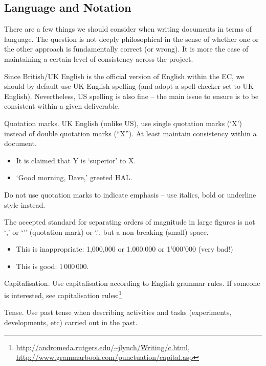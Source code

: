 \subsection{Language and Notation}
\label{sec:language-and_notation}

There are a few things we should consider when writing documents in terms of language. The question is not deeply philosophical in the sense of whether one or the other approach is fundamentally correct (or wrong). It is more the case of maintaining a certain level of consistency across the project.

Since British/UK English is the official version of English within the EC, we should by default use UK English spelling (and adopt a spell-checker set to UK English). Nevertheless, US spelling is also fine – the main issue to ensure is to be consistent within a given deliverable.

Quotation marks. UK English (unlike US), use single quotation marks (‘X’) instead of double quotation marks (``X''). At least maintain consistency within a document. 

\begin{itemize}
    \item It is claimed that Y is ‘superior’ to X. 
    \item ‘Good morning, Dave,’ greeted HAL.
\end{itemize}

Do not use quotation marks to indicate emphasis – use italics, bold or underline style instead.

The accepted standard for separating orders of magnitude in large figures is not ‘,’ or ‘’’ (quotation mark) or ‘.’, but a non-breaking (small) space. 

\begin{itemize}
    \item This is inappropriate: 1,000,000 or 1.000.000 or 1’000’000 (very bad!) 
    \item This is good: $1\,000\,000$. 
\end{itemize}

Capitalisation. Use capitalisation according to English grammar rules. If someone is interested, see 
capitalisation rules:\footnote{\url{http://andromeda.rutgers.edu/~jlynch/Writing/c.html}, \url{http://www.grammarbook.com/punctuation/capital.asp}}

Tense. Use past tense when describing activities and tasks (experiments, developments, etc) carried out in the past. 

